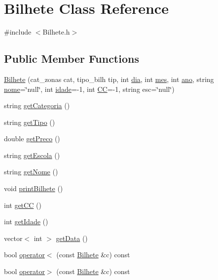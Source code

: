 \hypertarget{class_bilhete}{}\section{Bilhete Class Reference}
\label{class_bilhete}


{\ttfamily \#include $<$Bilhete.\+h$>$}

\subsection*{Public Member Functions}
\begin{DoxyCompactItemize}
\item 
\mbox{\hyperlink{class_bilhete_a474406ccf54268b9206c936be473a15d}{Bilhete}} (cat\+\_\+zonas cat, tipo\+\_\+bilh tip, int \mbox{\hyperlink{class_bilhete_ad3dbd72118947c8ebb9d2a1a9e6bc3eb}{dia}}, int \mbox{\hyperlink{class_bilhete_ad654ce2fb56eca0738e6994774bb9d75}{mes}}, int \mbox{\hyperlink{class_bilhete_a28c57c28b91d9d751cb8292911af4b00}{ano}}, string \mbox{\hyperlink{class_bilhete_a6c473f8854c6980af895803cfe742279}{nome}}=\char`\"{}null\char`\"{}, int \mbox{\hyperlink{class_bilhete_a5cd410905c9eeb3e0281df97ddc6b69a}{idade}}=-\/1, int \mbox{\hyperlink{class_bilhete_a3272957b6efbae819c70320b40823e46}{CC}}=-\/1, string esc=\char`\"{}null\char`\"{})
\item 
string \mbox{\hyperlink{class_bilhete_ab10b04a33753b9b0f5091bb5e6f12a20}{get\+Categoria}} ()
\item 
string \mbox{\hyperlink{class_bilhete_a454736f9880f0ee44e53cca1e894df7d}{get\+Tipo}} ()
\item 
double \mbox{\hyperlink{class_bilhete_af8800b8f21428964d446d2cb0747e9d8}{get\+Preco}} ()
\item 
string \mbox{\hyperlink{class_bilhete_adf630342c192da168a75e6bc983d7801}{get\+Escola}} ()
\item 
string \mbox{\hyperlink{class_bilhete_acd970616a71c2eaf21b0d616a7a5f7aa}{get\+Nome}} ()
\item 
void \mbox{\hyperlink{class_bilhete_abae0b23c34a8538b91ea5dbd70606525}{print\+Bilhete}} ()
\item 
int \mbox{\hyperlink{class_bilhete_a328c577511937f1ab79d9e785dd18564}{get\+CC}} ()
\item 
int \mbox{\hyperlink{class_bilhete_aa63d79d55516bdb158ffc9e8abaff93c}{get\+Idade}} ()
\item 
vector$<$ int $>$ \mbox{\hyperlink{class_bilhete_a89a41aff919d6acb173acc708367f2d3}{get\+Data}} ()
\item 
bool \mbox{\hyperlink{class_bilhete_a09be5c8b845201431c4e96cc6e441f11}{operator$<$}} (const \mbox{\hyperlink{class_bilhete}{Bilhete}} \&c) const
\item 
bool \mbox{\hyperlink{class_bilhete_a3fb340596c0ab30945a1de6b691c842b}{operator$>$}} (const \mbox{\hyperlink{class_bilhete}{Bilhete}} \&c) const
\end{DoxyCompactItemize}
